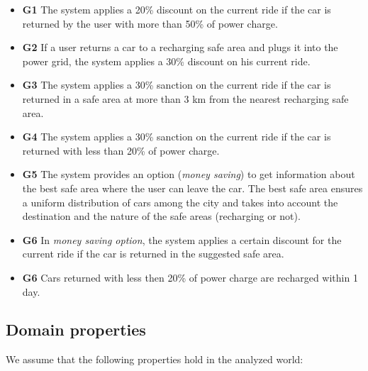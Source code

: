 \documentclass{article}
\begin{document}
\begin{itemize}
				\item \textbf{G1} The system applies a 20\% discount on the current ride if the car is returned by the user with more than 50\% of power charge.
				\item \textbf{G2} If a user returns a car to a recharging safe area and plugs it into the power grid, the system applies a 30\% discount on his current ride.
				\item \textbf{G3} The system applies a 30\% sanction on the current ride if the car is returned in a safe area at more than 3 km from the nearest recharging safe area.
				\item \textbf{G4} The system applies a 30\% sanction on the current ride if the car is returned with less than 20\% of power charge.
				\item \textbf{G5} The system provides an option (\textit{money saving}) to get information about the best safe area where the user can leave the car. The best safe area ensures a uniform distribution of cars among the city and takes into account the destination and the nature of the safe areas (recharging or not). %
				\item \textbf{G6} In \textit{money saving option}, the system applies a certain discount for the current ride if the car is returned in the suggested safe area. %
				\item \textbf{G6} Cars returned with less then 20\% of power charge are recharged within 1 day. %
			\end{itemize}

		\subsection{Domain properties}
			We assume that the following properties hold in the analyzed world:			
			
\end{document}
